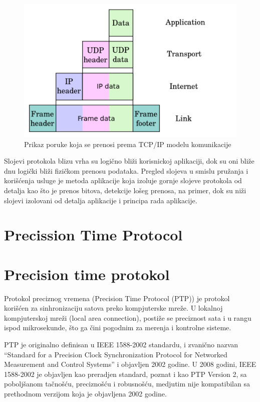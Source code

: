 \documentclass[a4paper,12pt, master]{etf}
\begin{document}
	\begin{figure}[htb]
			\centering
			\includegraphics[scale=.4]{../pic/tcpip_data.png}
			\caption{Prikaz poruke koja se prenosi prema TCP/IP modelu
					komunikacije}
			\label{fig:tcpip_data}
	\end{figure}

	Slojevi protokola blizu vrha su logi\v{c}no bli\v{z}i korisnickoj
	aplikaciji, dok su oni bli\v{z}e dnu logi\v{c}ki bli\v{z}i fizi\v{c}kom
	prenosu podataka. Pregled slojeva u smislu pru\v{z}anja i kori\v{s}\'{c}enja
	usluge je metoda aplikacije koja izoluje gornje slojeve protokola od
	detalja kao \v{s}to je prenos bitova, detekcije lo\v{s}eg prenosa, na
	primer, dok su ni\v{z}i slojevi izolovani od detalja aplikacije i principa
	rada aplikacije.

	\section{Precission Time Protocol}

	\section{Precision time protokol}

    Protokol preciznog vremena (Precision Time Protocol (PTP)) je protokol
	kori\v{s}\'{c}en za sinhronizaciju satova preko kompjuterske mre\v{z}e. U
	lokalnoj kompjuterskoj mre\v{z}i (local area connection), posti\v{z}e se
	preciznost sata i u rangu ispod mikrosekunde, \v{s}to ga \v{c}ini pogodnim
	za merenja i kontrolne sisteme.

	PTP je originalno definisan u IEEE 1588-2002 standardu, i zvani\v{c}no
	nazvan ``Standard for a Precision Clock Synchronization Protocol for
	Networked Measurement and Control Systems'' i objavljen 2002 godine. U 2008
	godini, IEEE 1588-2002 je objavljen kao preradjen standard, poznat i kao
	PTP Version 2, sa pobolj\v{s}anom ta\v{c}no\v{s}\'{c}u, precizno\v{s}\'{c}u
	i robusno\v{s}\'{c}u, medjutim nije kompatibilan sa prethodnom verzijom
	koja je objavljena 2002 godine.
\end{document}
